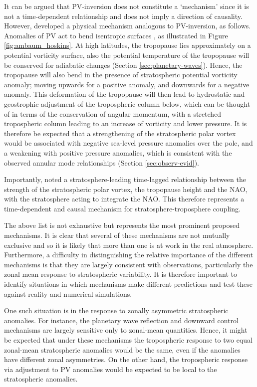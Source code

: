 \begin{itemize}
  It can be argued that PV-inversion does not constitute a `mechanism' since it
  is not a time-dependent relationship and does not imply a direction of
  causality. However, \citet{Ambaum2002} developed a physical mechanism
  analogous to PV-inversion, as follows. Anomalies of PV act to bend isentropic
  surfaces \citep{Hoskins1985}, as illustrated in Figure
  \ref{fig:ambaum_hoskins}. At high latitudes, the tropopause lies approximately
  on a potential vorticity surface, also the potential temperature of the
  tropopause will be conserved for adiabatic changes (Section
  \ref{sec:planetary-waves}). Hence, the tropopause will also bend in the
  presence of stratospheric potential vorticity anomaly; moving upwards for a
  positive anomaly, and downwards for a negative anomaly. This deformation of
  the tropopause will then lead to hydrostatic and geostrophic adjustment of the
  tropospheric column below, which can be thought of in terms of the
  conservation of angular momentum, with a stretched tropospheric column leading
  to an increase of vorticity and lower pressure. It is therefore be expected
  that a strengthening of the stratospheric polar vortex would be associated
  with negative sea-level pressure anomalies over the pole, and a weakening with
  positive pressure anomalies, which is consistent with the observed annular
  mode relationships (Section \ref{sec:observ-evid}).

  Importantly, \citet{Ambaum2002} noted a stratosphere-leading time-lagged
  relationship between the strength of the stratospheric polar vortex, the
  tropopause height and the NAO, with the stratosphere acting to integrate the
  NAO. This therefore represents a time-dependent and causal mechanism for
  stratosphere-troposphere coupling.

\end{itemize}

The above list is not exhaustive but represents the most prominent proposed
mechanisms. It is clear that several of these mechanisms are not mutually
exclusive and so it is likely that more than one is at work in the real
atmosphere. Furthermore, a difficulty in distinguishing the relative importance
of the different mechanisms is that they are largely consistent with
observations, particularly the zonal mean response to stratospheric
variability. It is therefore important to identify situations in which
mechanisms make different predictions and test these against reality and
numerical simulations.

One such situation is in the response to zonally asymmetric stratospheric
anomalies. For instance, the planetary wave reflection and downward control
mechanisms are largely sensitive only to zonal-mean quantities. Hence, it might
be expected that under these mechanisms the tropospheric response to two equal
zonal-mean stratospheric anomalies would be the same, even if the anomalies have
different zonal asymmetries. On the other hand, the tropospheric response via
adjustment to PV anomalies would be expected to be local to the stratospheric
anomalies.

